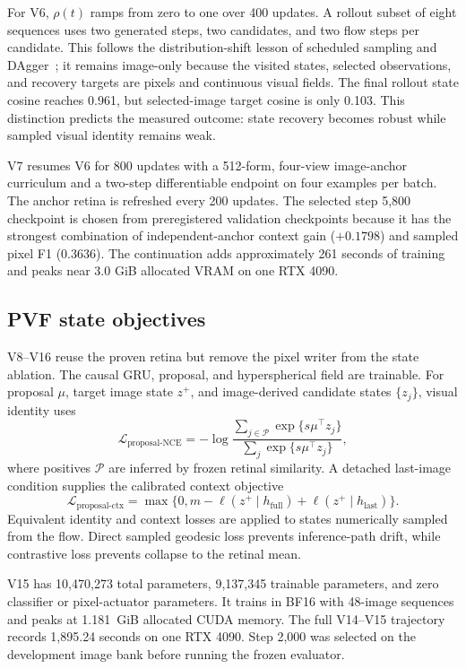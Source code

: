 \documentclass[11pt]{article}
\begin{document}
For V6, $\rho(t)$ ramps from zero to one over 400 updates. A rollout subset of
eight sequences uses two generated steps, two candidates, and two flow steps per
candidate. This follows the distribution-shift lesson of scheduled sampling and
DAgger~\cite{scheduledsampling,dagger}; it remains image-only because the visited
states, selected observations, and recovery targets are pixels and continuous
visual fields. The final rollout state cosine reaches 0.961, but selected-image
target cosine is only 0.103. This distinction predicts the measured outcome:
state recovery becomes robust while sampled visual identity remains weak.

V7 resumes V6 for 800 updates with a 512-form, four-view image-anchor
curriculum and a two-step differentiable endpoint on four examples per batch.
The anchor retina is refreshed every 200 updates. The selected step 5,800
checkpoint is chosen from preregistered validation checkpoints because it has
the strongest combination of independent-anchor context gain ($+0.1798$) and
sampled pixel F1 (0.3636). The continuation adds approximately 261 seconds of
training and peaks near 3.0 GiB allocated VRAM on one RTX 4090.

\subsection{PVF state objectives}

V8--V16 reuse the proven retina but remove the pixel writer from the state
ablation. The causal GRU, proposal, and hyperspherical field are trainable. For
proposal $\mu$, target image state $z^+$, and image-derived candidate states
$\{z_j\}$, visual identity uses
\[
\mathcal L_{\mathrm{proposal\text{-}NCE}}
=-\log\frac{\sum_{j\in\mathcal P}\exp\{s\mu^\top z_j\}}
{\sum_j\exp\{s\mu^\top z_j\}},
\]
where positives $\mathcal P$ are inferred by frozen retinal similarity. A
detached last-image condition supplies the calibrated context objective
\[
\mathcal L_{\mathrm{proposal\text{-}ctx}}=
\max\{0,m-\ell(z^+\mid h_{\mathrm{full}})
+\ell(z^+\mid h_{\mathrm{last}})\}.
\]
Equivalent identity and context losses are applied to states numerically
sampled from the flow. Direct sampled geodesic loss prevents inference-path
drift, while contrastive loss prevents collapse to the retinal mean.

V15 has 10,470,273 total parameters, 9,137,345 trainable parameters, and zero
classifier or pixel-actuator parameters. It trains in BF16 with 48-image
sequences and peaks at 1.181~GiB allocated CUDA memory. The full V14--V15
trajectory records 1,895.24 seconds on one RTX 4090. Step 2,000 was selected on
the development image bank before running the frozen evaluator.
\end{document}

